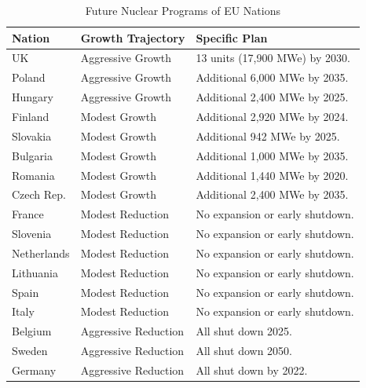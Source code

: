 \begin{table}[h]
    \centering
    \caption {Future Nuclear Programs of \gls{EU} Nations \cite{world_nuclear_association_nuclear_2017}}
        \begin{tabular}{lll}
            \hline 
                    \textbf{Nation} & \textbf{Growth Trajectory} & \textbf{Specific Plan }\\
                    \hline
                    UK & Aggressive Growth & {\small  13 units (17,900 \gls{MWe}) by 2030.}\\
                    Poland & Aggressive Growth &  {\small Additional 6,000 \gls{MWe} by 2035.}\\
                    Hungary & Aggressive Growth &  {\small Additional 2,400 \gls{MWe} by 2025.} \\ 
                    Finland & Modest Growth &  {\small Additional 2,920 \gls{MWe} by 2024.}\\
                    Slovakia & Modest Growth & {\small Additional 942 \gls{MWe} by 2025.}\\
                    Bulgaria & Modest Growth &  {\small Additional 1,000 \gls{MWe} by 2035.} \\
                    Romania & Modest Growth &  {\small Additional 1,440 \gls{MWe} by 2020.} \\
                    Czech Rep. & Modest Growth & {\small  Additional 2,400 \gls{MWe} by 2035.}\\
                    France & Modest Reduction & {\small No expansion or early shutdown.}\\
                    Slovenia & Modest Reduction & {\small No expansion or early shutdown.}\\
                    Netherlands & Modest Reduction & {\small No expansion or early shutdown.}\\
                    Lithuania & Modest Reduction & {\small No expansion or early shutdown.}\\
                    Spain & Modest Reduction &  {\small No expansion or early shutdown.} \\
                    Italy & Modest Reduction & {\small No expansion or early shutdown. }\\
                    Belgium & Aggressive Reduction & All shut down 2025.\\
                    Sweden & Aggressive Reduction & All shut down 2050.\\
                    Germany & Aggressive Reduction & All shut down by 2022.\\
                    \hline
                    
        \end{tabular}

    
  \label{tab:eu_growth}
\end{table}
\FloatBarrier

